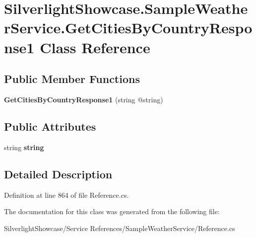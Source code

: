 \hypertarget{class_silverlight_showcase_1_1_sample_weather_service_1_1_get_cities_by_country_response1}{
\section{SilverlightShowcase.SampleWeatherService.GetCitiesByCountryResponse1 Class Reference}
\label{class_silverlight_showcase_1_1_sample_weather_service_1_1_get_cities_by_country_response1}
}
\subsection*{Public Member Functions}
\begin{DoxyCompactItemize}
\item 
\hypertarget{class_silverlight_showcase_1_1_sample_weather_service_1_1_get_cities_by_country_response1_ad512f6f42a2e34c4a1d53c3f9d69c5c1}{
{\bfseries GetCitiesByCountryResponse1} (string @string)}
\label{class_silverlight_showcase_1_1_sample_weather_service_1_1_get_cities_by_country_response1_ad512f6f42a2e34c4a1d53c3f9d69c5c1}

\end{DoxyCompactItemize}
\subsection*{Public Attributes}
\begin{DoxyCompactItemize}
\item 
\hypertarget{class_silverlight_showcase_1_1_sample_weather_service_1_1_get_cities_by_country_response1_adb260c73fe5485d79451144321aec8be}{
string {\bfseries string}}
\label{class_silverlight_showcase_1_1_sample_weather_service_1_1_get_cities_by_country_response1_adb260c73fe5485d79451144321aec8be}

\end{DoxyCompactItemize}


\subsection{Detailed Description}


Definition at line 864 of file Reference.cs.

The documentation for this class was generated from the following file:\begin{DoxyCompactItemize}
\item 
SilverlightShowcase/Service References/SampleWeatherService/Reference.cs\end{DoxyCompactItemize}
